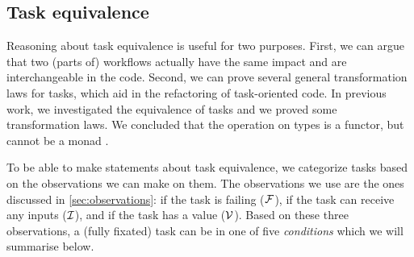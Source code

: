 \newcommand{\citeprop}[1]{} %

\subsection{Task equivalence}
\label{sec:equivalence}

Reasoning about task equivalence is useful for two purposes.
First, we can argue that two (parts of) workflows
actually have the same impact and are interchangeable in the code.
Second, we can prove several general transformation laws for tasks,
which aid in the refactoring of task-oriented code.
%
In previous work, we investigated the equivalence of tasks
and we proved some transformation laws.
We concluded that the  operation on types is a functor,
but cannot be a monad \cite{conf/sfp/KlijnsmaS22}.

To be able to make statements about task equivalence,
we categorize tasks based on the observations we can make on them.
The observations we use are the ones discussed in \cref{sec:observations}:
if the task is failing ($\mathcal{F}$),
if the task can receive any inputs ($\mathcal{I}$),
and if the task has a value ($\mathcal{V}$).
Based on these three observations,
a (fully fixated) task can be in one of five \emph{conditions} which we will summarise below.


